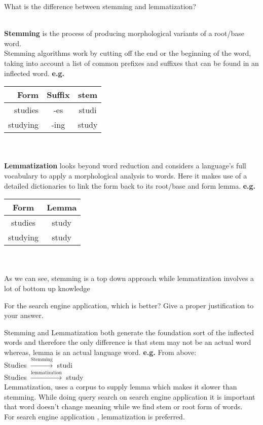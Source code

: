 \documentclass[11pt]{exam}
\begin{document}
\begin{questions}
\question What is the difference between stemming and lemmatization?
\begin{solution}\\
    \textbf{Stemming} is the process of producing morphological variants of a root/base word.\\
    Stemming algorithms work by cutting off the end or the beginning of the word, taking into account a list of common prefixes and suffixes that can be found in an inflected word. \textbf{e.g.}\\
    \begin{tabular}{r|c|c}
     Form & Suffix & stem \\
     \hline
     studies & -es & studi\\
     studying & -ing & study\\
    \end{tabular}\\
    \\ \textbf{Lemmatization} looks beyond word reduction and considers a language’s full vocabulary to apply a morphological analysis to words. Here it makes use of a detailed dictionaries to link the form back to its root/base and form lemma. \textbf{e.g.}\\
    \begin{tabular}{c|c}
    Form & Lemma\\
    \hline
    studies & study \\
    studying & study
    \end{tabular}\\\\
    As we can see, stemming is a top down approach while lemmatization involves a lot of bottom up knowledge
\end{solution}

\question For the search engine application, which is better? Give a proper justification to your
answer.
\begin{solution}
    Stemming and Lemmatization both generate the foundation sort of the inflected words and therefore the only difference is that stem may not be an actual word whereas, lemma is an actual language word. \textbf{e.g.} From above:\\
    Studies $\xrightarrow{\text{Stemming}}$ studi\\
    Studies $\xrightarrow{\text{lemmatization}}$ study\\
    Lemmatization, uses a corpus to supply lemma which makes it slower than stemming. While doing query search on search engine application it is important that word doesn't change meaning while we find stem or root form of words.\\
    For search engine application , lemmatization is preferred.
\end{solution}


\end{questions}
\end{document}
